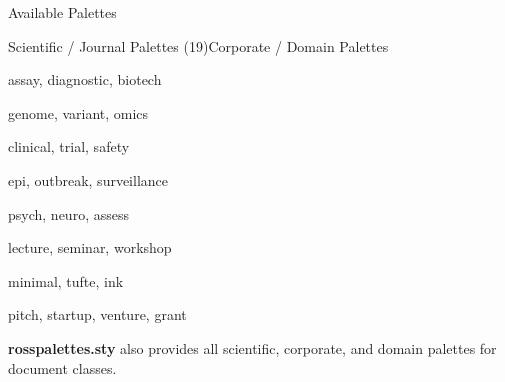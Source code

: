 \documentclass[palette=lancet]{rossbeamerscientific}
\begin{document}
\begin{frame}{Available Palettes}
\begin{comparison}{Scientific / Journal Palettes (19)}{Corporate / Domain Palettes}
\begin{description}[leftmargin=0pt,font=\normalfont\ttfamily]
    \item[Biomarker] assay, diagnostic, biotech
    \item[Genomics] genome, variant, omics
    \item[Clinical] clinical, trial, safety
    \item[Epi] epi, outbreak, surveillance
    \item[Psych] psych, neuro, assess
    \item[Teaching] lecture, seminar, workshop
    \item[Minimal] minimal, tufte, ink
    \item[Pitch] pitch, startup, venture, grant
  \end{description}
  \vskip4pt
  \textbf{rosspalettes.sty} also provides all scientific,
  corporate, and domain palettes for document classes.
\end{comparison}
\end{frame}
\end{document}
